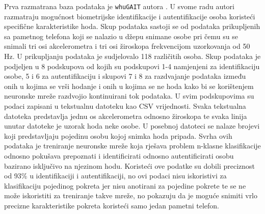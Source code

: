 \documentclass[times, utf8, diplomski]{fer}
\begin{document}
Prva razmatrana baza podataka je \texttt{whuGAIT} autora \cite{zou2020gait}. U svome radu autori razmatraju mogućnost biometrijske
identifikacije i autentifikacije osoba koristeći specifične karakteristike hoda. Skup podataka sastoji se od podataka prikupljenih
sa pametnog telefona koji se nalazio u džepu snimane osobe pri čemu su se snimali tri osi akcelerometra i tri osi
žiroskopa frekvencijom uzorkovanja od 50 Hz. U prikupljanju podataka je sudjelovalo 118 različitih osoba. Skup podataka je podjeljen
u 8 podskupova od kojih su podskupovi 1-4 namjenjeni za identifikaciju osobe, 5 i 6 za autentifikaciju i skupovi 7 i 8 za
razdvajanje podataka između onih u kojima se vrši hodanje i onih u kojima se ne hoda kako bi se korištenjem neuronske mreže
razdvojio kontinuirani tok podataka. U svim podskupovima su podaci zapisani u tekstualnu datoteku kao CSV vrijednosti. Svaka
tekstualna datoteka predstavlja jednu os akcelerometra odnosno žiroskopa te svaka linija unutar datoteke je uzorak hoda neke osobe.
U posebnoj datoteci se nalaze brojevi koji predstavljaju pojedinu osobu kojoj snimka hoda pripada. Svrha ovih podataka je treniranje
neuronske mreže koja rješava problem n-klasne klasifikacije odnosno pokušava prepoznati i identificirati odnosno autentificirati
osobu bazirano isključivo na njezinom hodu. Koristeći ove podatke \cite{zou2020gait} su dobili preciznost od 93\% u identifikaciji 
i autentifikaciji, no ovi podaci nisu iskoristivi za klasifikaciju pojedinog pokreta jer nisu anotirani za pojedine pokrete te se 
ne može iskoristiti za treniranje takve mreže, no pokazuju da je moguće snimiti vrlo precizne karakteristike pokreta koristeći samo 
jedan pametni telefon.
\end{document}
